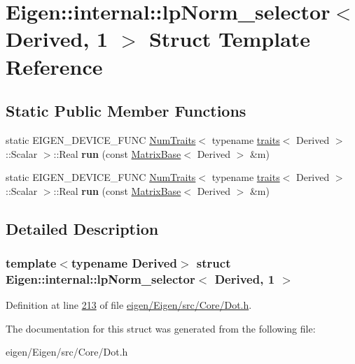 \hypertarget{struct_eigen_1_1internal_1_1lp_norm__selector_3_01_derived_00_011_01_4}{}\section{Eigen\+:\+:internal\+:\+:lp\+Norm\+\_\+selector$<$ Derived, 1 $>$ Struct Template Reference}
\label{struct_eigen_1_1internal_1_1lp_norm__selector_3_01_derived_00_011_01_4}
\subsection*{Static Public Member Functions}
\begin{DoxyCompactItemize}
\item 
\mbox{\label{struct_eigen_1_1internal_1_1lp_norm__selector_3_01_derived_00_011_01_4_a7e850eb01b8f6b5e84d1a11d0236a348}} 
static E\+I\+G\+E\+N\+\_\+\+D\+E\+V\+I\+C\+E\+\_\+\+F\+U\+NC \hyperlink{group___core___module_struct_eigen_1_1_num_traits}{Num\+Traits}$<$ typename \hyperlink{struct_eigen_1_1internal_1_1traits}{traits}$<$ Derived $>$\+::Scalar $>$\+::Real {\bfseries run} (const \hyperlink{group___core___module_class_eigen_1_1_matrix_base}{Matrix\+Base}$<$ Derived $>$ \&m)
\item 
\mbox{\label{struct_eigen_1_1internal_1_1lp_norm__selector_3_01_derived_00_011_01_4_a7e850eb01b8f6b5e84d1a11d0236a348}} 
static E\+I\+G\+E\+N\+\_\+\+D\+E\+V\+I\+C\+E\+\_\+\+F\+U\+NC \hyperlink{group___core___module_struct_eigen_1_1_num_traits}{Num\+Traits}$<$ typename \hyperlink{struct_eigen_1_1internal_1_1traits}{traits}$<$ Derived $>$\+::Scalar $>$\+::Real {\bfseries run} (const \hyperlink{group___core___module_class_eigen_1_1_matrix_base}{Matrix\+Base}$<$ Derived $>$ \&m)
\end{DoxyCompactItemize}


\subsection{Detailed Description}
\subsubsection*{template$<$typename Derived$>$\newline
struct Eigen\+::internal\+::lp\+Norm\+\_\+selector$<$ Derived, 1 $>$}



Definition at line \hyperlink{eigen_2_eigen_2src_2_core_2_dot_8h_source_l00213}{213} of file \hyperlink{eigen_2_eigen_2src_2_core_2_dot_8h_source}{eigen/\+Eigen/src/\+Core/\+Dot.\+h}.



The documentation for this struct was generated from the following file\+:\begin{DoxyCompactItemize}
\item 
eigen/\+Eigen/src/\+Core/\+Dot.\+h\end{DoxyCompactItemize}
